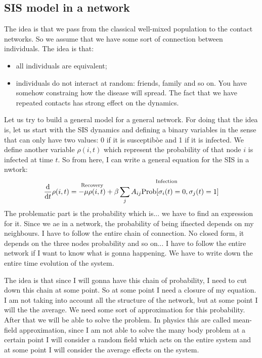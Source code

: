 \documentclass[../main/main.tex]{subfiles}
\begin{document}
\subsection{SIS model in a network}

The idea is that we pass from the classical well-mixed population to the contact networks. So we assume that we have some sort of connection between individuals. The idea is that:
\begin{itemize}
\item all individuals are equivalent;
\item individuals do not interact at random: friends, family and so on. You have somehow constraing how the disease will spread. The fact that we have repeated contacts has strong effect on the dynamics.
\end{itemize}
Let us try to build a general model for a general network. For doing that the idea is, let us start with the SIS dynamics and defining a binary variables in the sense that can only have two values: 0 if it is susceptibòe and 1 if it is infected. We define another variable \( \rho (i,t) \) which represent the probability of that node \( i \) is infected at time \( t \). So from here, I can write a general equation for the SIS in a nwtork:
\begin{equation*}
  \dv{}{t} \rho (i,t) = \overset{\text{Recovery}}{- \mu  \rho (i,t)} + \overset{\text{Infection}}{\beta \sum_{j}^{} A_{ij} \text{Prob} [\sigma _i (t) = 0, \sigma _j (t ) =1 ]   }
\end{equation*}
The problematic part is the probability which is... we have to find an expression for it. Since we ae in a network, the probability of being ifnected depends on my neighbours. I have to follow the entire chain of connection. No closed form, it depends on the three nodes probability and so on... I have to follow the entire network if I want to know what is gonna happening.
We have to write down the entire time evolution of the system.

The idea is that since I will gonna have this chain of probability, I need to cut down this chain at some point. So at some point I need a closure of my equation. I am not taking into account all the structure of the network, but at some point I will the the average. We need some sort of approximation for this probability. After that we will be able to solve the problem.
In physics this are called mean-field approximation, since I am not able to solve the many body problem at a certain point I will consider a random field which acts on the entire system and at some point I will consider the average effects on the system.
\end{document}
